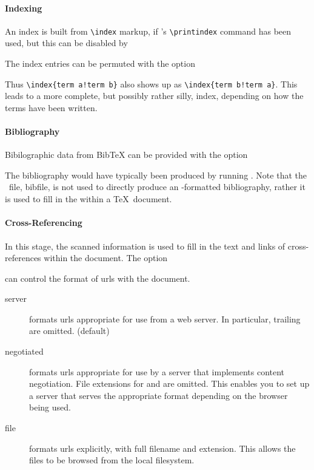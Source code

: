 \documentclass{book}
\begin{document}
\paragraph{Indexing}
An index is built from \verb|\index| markup, if
's \verb|\printindex| command has been used,
but this can be disabled by
\begin{quote}
\end{quote}
The index entries can be permuted with the option
\begin{quote}
\end{quote}
Thus \verb|\index{term a!term b}| also shows up as \verb|\index{term b!term a}|.
This leads to a more complete, but possibly rather silly, index,
depending on how the terms have been written.

\paragraph{Bibliography}
Bibilographic data from BibTeX can be provided with the option
\begin{quote}
\end{quote}
The bibliography would have typically been produced by running
.
Note that the \XML\ file, bibfile, is not used to directly produce
an \HTML-formatted bibliography, rather it is used to fill in
the \verb|| within a \TeX\ document.

\paragraph{Cross-Referencing}
In this stage, the scanned information is used to fill in the
text and links of cross-references within the document.
The option
\begin{quote}
\end{quote}
can control the format of urls with the document.
\begin{description}
  \item[server] formats urls appropriate for use from a web server.
    In particular, trailing  are omitted. (default)
  \item[negotiated] formats urls appropriate for use by a server
    that implements content negotiation. File extensions for 
    and  are omitted.  This enables you to set up a server
    that serves the appropriate format depending on the browser being used.
  \item[file] formats urls explicitly, with full filename and extension.
    This allows the files to be browsed from the local filesystem.
\end{description}
\end{document}
